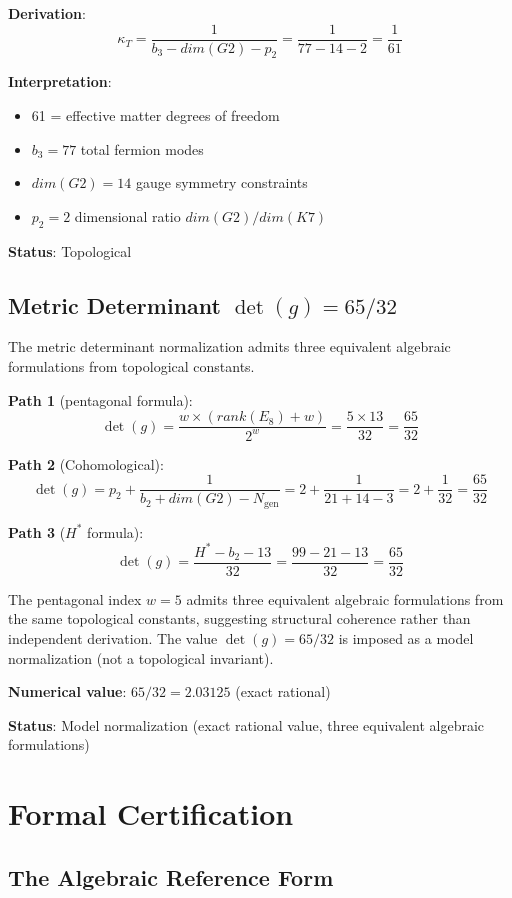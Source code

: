 \documentclass[11pt,a4paper]{article}
\newcommand{\E}{\mathrm{E}}
\newcommand{\Gtwo}{\mathrm{G}_2}
\newcommand{\Kseven}{K_7}
\newcommand{\dimE}{\mathrm{dim}}
\newcommand{\rk}{\mathrm{rank}}
\newcommand{\topomark}{\textsc{Topological}}
\def\Gtwo{G2}%
\def\Kseven{K7}%
\def\E{E}%
\def\dimE{dim}%
\def\rk{rank}%
\def\topomark{Topological}%
\begin{document}
\textbf{Derivation}:
$$\kappa_T = \frac{1}{b_3 - \dimE(\Gtwo) - p_2} = \frac{1}{77 - 14 - 2} = \frac{1}{61}$$

\textbf{Interpretation}:
\begin{itemize}
\item 61 = effective matter degrees of freedom
\item $b_3 = 77$ total fermion modes
\item $\dimE(\Gtwo) = 14$ gauge symmetry constraints
\item $p_2 = 2$ dimensional ratio $\dimE(\Gtwo)/\dimE(\Kseven)$
\end{itemize}

\textbf{Status}: \topomark{}

\subsection{Metric Determinant $\det(g) = 65/32$}

The metric determinant normalization admits three equivalent algebraic formulations from topological constants.

\textbf{Path 1} (pentagonal formula):
$$\det(g) = \frac{w \times (\rk(\E_8) + w)}{2^{w}} = \frac{5 \times 13}{32} = \frac{65}{32}$$

\textbf{Path 2} (Cohomological):
$$\det(g) = p_2 + \frac{1}{b_2 + \dimE(\Gtwo) - N_{\mathrm{gen}}} = 2 + \frac{1}{21+14-3} = 2 + \frac{1}{32} = \frac{65}{32}$$

\textbf{Path 3} ($H^*$ formula):
$$\det(g) = \frac{H^* - b_2 - 13}{32} = \frac{99 - 21 - 13}{32} = \frac{65}{32}$$

The pentagonal index $w = 5$ admits three equivalent algebraic formulations from the same topological constants, suggesting structural coherence rather than independent derivation. The value $\det(g) = 65/32$ is imposed as a model normalization (not a topological invariant).

\textbf{Numerical value}: $65/32 = 2.03125$ (exact rational)

\textbf{Status}: Model normalization (exact rational value, three equivalent algebraic formulations)

\section{Formal Certification}

\subsection{The Algebraic Reference Form}
\end{document}
